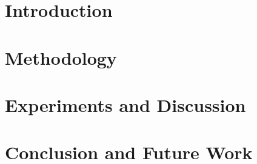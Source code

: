 \documentclass[hidelinks, a4paper,nobind]{ociamthesis}
\newcommand*{\bibtitle}{References}
\begin{document}
\flushbottom
\part{Introduction}



\part{Methodology}



\part{Experiments and Discussion}


\part{Conclusion and Future Work}


%


%




\setlength{\baselineskip}{0pt} %

{\renewcommand*\MakeUppercase[1]{#1}%
\printbibliography[heading=bibintoc,title={\bibtitle}]}
\end{document}
